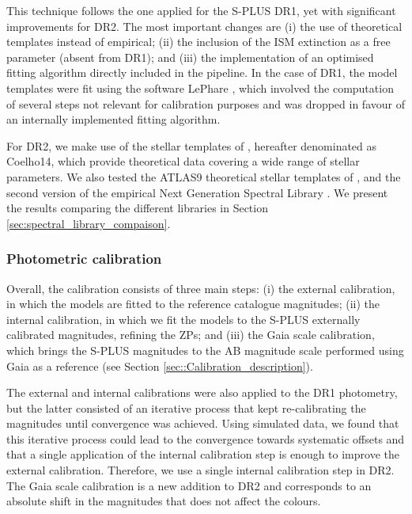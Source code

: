 \documentclass[fleqn,usenatbib]{mnras}
\begin{document}
This technique follows the one applied for the S-PLUS DR1, yet with significant improvements for DR2. The most important changes are (i) the use of theoretical templates instead of empirical; (ii) the inclusion of the ISM extinction as a free parameter (absent from DR1); and (iii) the implementation of an optimised fitting algorithm directly included in the pipeline. In the case of DR1, the model templates were fit using the software LePhare \citep{Arnouts+1999, Ilbert+2006}, which involved the computation of several steps not relevant for calibration purposes and was dropped in favour of an internally implemented fitting algorithm.

For DR2, we make use of the stellar templates of \citet{Coelho14}, hereafter denominated as Coelho14, which provide theoretical data covering a wide range of stellar parameters. We also tested the ATLAS9 theoretical stellar templates of \citep[][hereafter C\&K03]{Castelli+Kurucz2003}, and the second version of the empirical Next Generation Spectral Library \citep[NGSL][]{Gregg+2006, Heap2007}. We present the results comparing the different libraries in Section \ref{sec:spectral_library_compaison}.

\subsubsection{Photometric calibration}

Overall, the calibration consists of three main steps: (i) the external calibration, in which the models are fitted to the reference catalogue magnitudes; (ii) the internal calibration, in which we fit the models to the S-PLUS externally calibrated magnitudes, refining the ZPs; and (iii) the Gaia scale calibration, which brings the S-PLUS magnitudes to the AB magnitude scale performed using Gaia as a reference (see Section \ref{sec::Calibration_description}).

The external and internal calibrations were also applied to the DR1 photometry, but the latter consisted of an iterative process that kept re-calibrating the magnitudes until convergence was achieved. Using simulated data, we found that this iterative process could lead to the convergence towards systematic offsets and that a single application of the internal calibration step is enough to improve the external calibration. Therefore, we use a single internal calibration step in DR2. The Gaia scale calibration is a new addition to DR2 and corresponds to an absolute shift in the magnitudes that does not affect the colours.
\end{document}
